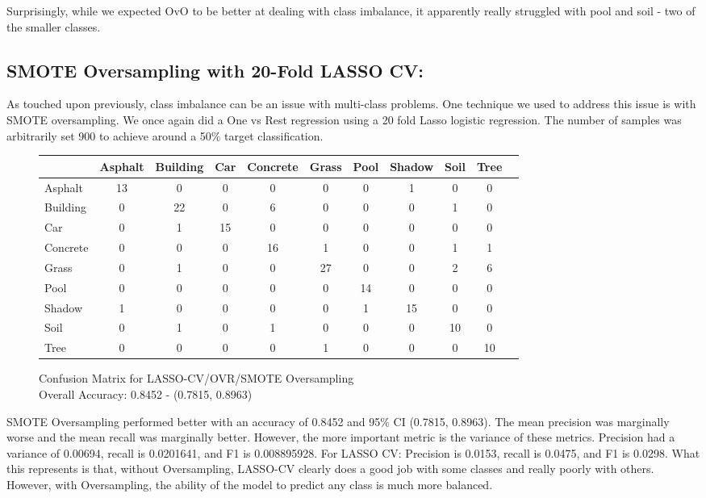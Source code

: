 \documentclass[11pt]{article}
\begin{document}
Surprisingly, while we expected OvO to be better at dealing with class imbalance, it apparently really struggled with pool and soil - two of the smaller classes.

\subsection{SMOTE Oversampling with 20-Fold LASSO CV:}
As touched upon previously, class imbalance can be an issue with multi-class problems. One technique we used to address this issue is with SMOTE oversampling. We once again did a One vs Rest regression using a 20 fold Lasso logistic regression. The number of samples was arbitrarily set 900 to achieve around a 50\% target classification.\\

\begin{figure}
    \centering
  \begin{tabular}{lcccccccccc}
  \toprule
  & Asphalt & Building & Car & Concrete & Grass & Pool & Shadow & Soil & Tree \\
  \midrule
  Asphalt & 13 & 0 & 0 & 0 & 0 & 0 & 1 & 0 & 0 \\
  Building & 0 & 22 & 0 & 6 & 0 & 0 & 0 & 1 & 0 \\
  Car & 0 & 1 & 15 & 0 & 0 & 0 & 0 & 0 & 0 \\
  Concrete & 0 & 0 & 0 & 16 & 1 & 0 & 0 & 1 & 1 \\
  Grass & 0 & 1 & 0 & 0 & 27 & 0 & 0 & 2 & 6 \\
  Pool & 0 & 0 & 0 & 0 & 0 & 14 & 0 & 0 & 0 \\
  Shadow & 1 & 0 & 0 & 0 & 0 & 1 & 15 & 0 & 0 \\
  Soil & 0 & 1 & 0 & 1 & 0 & 0 & 0 & 10 & 0 \\
  Tree & 0 & 0 & 0 & 0 & 1 & 0 & 0 & 0 & 10 \\
  \bottomrule
   \end{tabular}
   \captionsetup{justification=centering}
    \caption{Confusion Matrix for LASSO-CV/OVR/SMOTE Oversampling\\ Overall Accuracy: 0.8452 - (0.7815, 0.8963)}
    \label{tab:confusion_matrix}
\end{figure}%

SMOTE Oversampling performed better with an accuracy of  0.8452 and 95\% CI (0.7815, 0.8963).  The mean precision was marginally worse and the mean recall was marginally better. However, the more important metric is the variance of these metrics.  Precision had a variance of 0.00694, recall is 0.0201641, and F1 is 0.008895928. For LASSO CV: Precision is 0.0153, recall is 0.0475, and F1 is 0.0298. What this represents is that, without Oversampling, LASSO-CV clearly does a good job with some classes and really poorly with others. However, with Oversampling, the ability of the model to predict any class is much more balanced.
\end{document}
